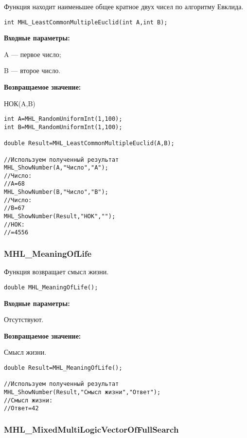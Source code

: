 \documentclass[a4paper,12pt]{article}
\begin{document}
Функция находит наименьшее общее кратное двух чисел по алгоритму Евклида.


\begin{lstlisting}[label=code_syntax_MHL_LeastCommonMultipleEuclid,caption=Синтаксис]
int MHL_LeastCommonMultipleEuclid(int A,int B);
\end{lstlisting}

\textbf{Входные параметры:}  
 
A --- первое число;
 
B --- второе число.

\textbf{Возвращаемое значение:}
 
 НОК(A,B)


\begin{lstlisting}[label=code_use_MHL_LeastCommonMultipleEuclid,caption=Пример использования]
int A=MHL_RandomUniformInt(1,100);
int B=MHL_RandomUniformInt(1,100);

double Result=MHL_LeastCommonMultipleEuclid(A,B);

//Используем полученный результат
MHL_ShowNumber(A,"Число","A");
//Число:
//A=68
MHL_ShowNumber(B,"Число","B");
//Число:
//B=67
MHL_ShowNumber(Result,"НОК","");
//НОК:
//=4556
\end{lstlisting}

\subsubsection{MHL\_MeaningOfLife}\label{MHL_MeaningOfLife}

Функция возвращает смысл жизни.


\begin{lstlisting}[label=code_syntax_MHL_MeaningOfLife,caption=Синтаксис]
double MHL_MeaningOfLife();
\end{lstlisting}

\textbf{Входные параметры:}  
 
Отсутствуют.

\textbf{Возвращаемое значение:}

Смысл жизни.


\begin{lstlisting}[label=code_use_MHL_MeaningOfLife,caption=Пример использования]
double Result=MHL_MeaningOfLife();

//Используем полученный результат
MHL_ShowNumber(Result,"Смысл жизни","Ответ");
//Смысл жизни:
//Ответ=42
\end{lstlisting}

\subsubsection{MHL\_MixedMultiLogicVectorOfFullSearch}\label{MHL_MixedMultiLogicVectorOfFullSearch}
\end{document}

